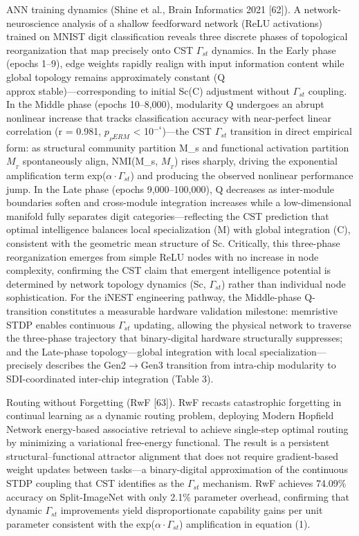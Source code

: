 \documentclass[a4paper,12pt]{article}
\begin{document}
ANN training dynamics (Shine et al., Brain Informatics 2021 [62]). A network-neuroscience analysis of a shallow feedforward network (ReLU activations) trained on MNIST digit classification reveals three discrete phases of topological reorganization that map precisely onto CST $\Gamma_{st}$ dynamics. In the Early phase (epochs 1--9), edge weights rapidly realign with input information content while global topology remains approximately constant (Q  \\approx  stable)---corresponding to initial Sc(C) adjustment without $\Gamma_{st}$ coupling. In the Middle phase (epochs 10--8,000), modularity Q undergoes an abrupt nonlinear increase that tracks classification accuracy with near-perfect linear correlation (r = 0.981, $p_{_PERM}$ < 10$^{-}^4$)---the CST $\Gamma_{st}$ transition in direct empirical form: as structural community partition M_{s} and functional activation partition $M_{_T}$ spontaneously align, NMI(M_{s}, $M_{_T}$) rises sharply, driving the exponential amplification term exp($\alpha \cdot \Gamma_{st}$) and producing the observed nonlinear performance jump. In the Late phase (epochs 9,000--100,000), Q decreases as inter-module boundaries soften and cross-module integration increases while a low-dimensional manifold fully separates digit categories---reflecting the CST prediction that optimal intelligence balances local specialization (M) with global integration (C), consistent with the geometric mean structure of Sc. Critically, this three-phase reorganization emerges from simple ReLU nodes with no increase in node complexity, confirming the CST claim that emergent intelligence potential is determined by network topology dynamics (Sc, $\Gamma_{st}$) rather than individual node sophistication. For the iNEST engineering pathway, the Middle-phase Q-transition constitutes a measurable hardware validation milestone: memristive STDP enables continuous $\Gamma_{st}$ updating, allowing the physical network to traverse the three-phase trajectory that binary-digital hardware structurally suppresses; and the Late-phase topology---global integration with local specialization---precisely describes the Gen2$\rightarrow$Gen3 transition from intra-chip modularity to SDI-coordinated inter-chip integration (Table 3).


Routing without Forgetting (RwF [63]). RwF recasts catastrophic forgetting in continual learning as a dynamic routing problem, deploying Modern Hopfield Network energy-based associative retrieval to achieve single-step optimal routing by minimizing a variational free-energy functional. The result is a persistent structural--functional attractor alignment that does not require gradient-based weight updates between tasks---a binary-digital approximation of the continuous STDP coupling that CST identifies as the $\Gamma_{st}$ mechanism. RwF achieves 74.09\% accuracy on Split-ImageNet with only 2.1\% parameter overhead, confirming that dynamic $\Gamma_{st}$ improvements yield disproportionate capability gains per unit parameter consistent with the exp($\alpha \cdot \Gamma_{st}$) amplification in equation (1).
\end{document}

